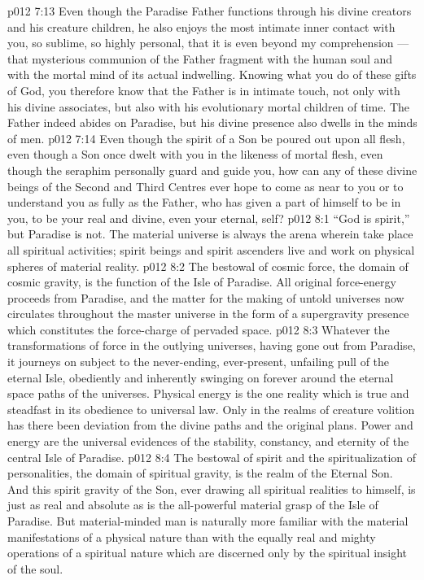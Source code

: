 \vs p012 7:13 \pc Even though the Paradise Father functions through his divine creators and his creature children, he also enjoys the most intimate inner contact with you, so sublime, so highly personal, that it is even beyond my comprehension --- that mysterious communion of the Father fragment with the human soul and with the mortal mind of its actual indwelling. Knowing what you do of these gifts of God, you therefore know that the Father is in intimate touch, not only with his divine associates, but also with his evolutionary mortal children of time. The Father indeed abides on Paradise, but his divine presence also dwells in the minds of men.
\vs p012 7:14 Even though the spirit of a Son be poured out upon all flesh, even though a Son once dwelt with you in the likeness of mortal flesh, even though the seraphim personally guard and guide you, how can any of these divine beings of the Second and Third Centres ever hope to come as near to you or to understand you as fully as the Father, who has given a part of himself to be in you, to be your real and divine, even your eternal, self?
\vs p012 8:1 “God is spirit,” but Paradise is not. The material universe is always the arena wherein take place all spiritual activities; spirit beings and spirit ascenders live and work on physical spheres of material reality.
\vs p012 8:2 \pc The bestowal of cosmic force, the domain of cosmic gravity, is the function of the Isle of Paradise. All original force\hyp{}energy proceeds from Paradise, and the matter for the making of untold universes now circulates throughout the master universe in the form of a supergravity presence which constitutes the force\hyp{}charge of pervaded space.
\vs p012 8:3 Whatever the transformations of force in the outlying universes, having gone out from Paradise, it journeys on subject to the never\hyp{}ending, ever\hyp{}present, unfailing pull of the eternal Isle, obediently and inherently swinging on forever around the eternal space paths of the universes. Physical energy is the one reality which is true and steadfast in its obedience to universal law. Only in the realms of creature volition has there been deviation from the divine paths and the original plans. Power and energy are the universal evidences of the stability, constancy, and eternity of the central Isle of Paradise.
\vs p012 8:4 \pc The bestowal of spirit and the spiritualization of personalities, the domain of spiritual gravity, is the realm of the Eternal Son. And this spirit gravity of the Son, ever drawing all spiritual realities to himself, is just as real and absolute as is the all\hyp{}powerful material grasp of the Isle of Paradise. But material\hyp{}minded man is naturally more familiar with the material manifestations of a physical nature than with the equally real and mighty operations of a spiritual nature which are discerned only by the spiritual insight of the soul.
